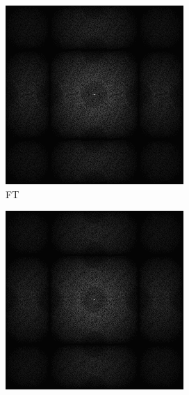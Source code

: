 \begin{figure}[H]
\begin{tcolorbox}[boxrule=4pt,sharp corners=downhill,title=Szene unter Kamerabewegung, fonttitle=\bfseries]
\begin{subfigure}[b]{0.2\linewidth}
      \includegraphics[width=\linewidth]{content/TemporalerAlg/Bilder/Reprojection/TemporalRepr/Ausschnitte/Ausschnitt2_FFT.png}
      \caption{FT}
      \label{pic:TemporalRepr_2_FFT}
    \end{subfigure}
    \begin{subfigure}[b]{0.2\linewidth}
      \includegraphics[width=\linewidth]{content/TemporalerAlg/Bilder/Reprojection/TemporalRepr/Ausschnitte/Ausschnitt3_FFT.png}

\end{subfigure}
\end{tcolorbox}
\end{figure}
